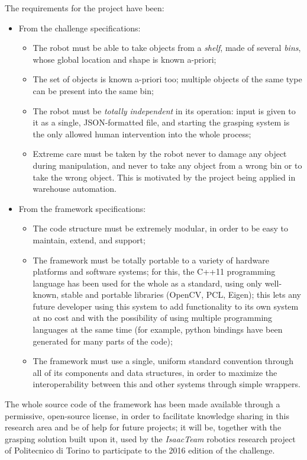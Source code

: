 \documentclass[a4paper,11pt]{article}
\begin{document}
The requirements for the project have been:
\begin{itemize}
\item{From  the challenge specifications:
    \begin{itemize}
    \item{The robot must be able to take objects from a \emph{shelf},
      made of several \emph{bins}, whose global location and shape is known
      a-priori;}
    \item{The set of objects is known a-priori too; multiple objects
      of the same type can be present into the same bin;}
    \item{The robot must be \emph{totally independent} in its
      operation: input is given to it as a single, JSON-formatted
      file, and starting the grasping system is the only allowed
      human intervention into the whole process;}
    \item{Extreme care must be taken by the robot never to damage any
      object during manipulation, and never to take any object from a
      wrong bin or to take the wrong object. This is motivated by the
      project being applied in warehouse automation.}
    \end{itemize}
    }
\item{From the framework specifications:
  \begin{itemize}
  \item{The code structure must be extremely modular, in order to be
    easy to maintain, extend, and support;}
  \item{The framework must be totally portable to a variety of hardware
    platforms and software systems; for this, the C++11 programming language has been used for the
  whole as a standard, using only well-known, stable and portable libraries
(OpenCV, PCL, Eigen); this lets any future developer using this system to add
functionality to its own system at no cost and with the possibility of using
multiple programming languages at the same time (for example, python bindings have been generated
for many parts of the code);}
  \item{The framework must use a single, uniform standard convention through all
      of its components and data structures, in order to maximize the
    interoperability between this and other systems through simple wrappers.}
  \end{itemize}
  }
\end{itemize}

The whole source code of the framework has been made available through a
permissive, open-source license, in order to facilitate knowledge sharing in
this research area and be of help for future projects; it will be, together with
the grasping solution built upon it, used by the \emph{IsaacTeam} robotics research
project of Politecnico di Torino to participate to the 2016 edition of the
challenge.
\end{document}

